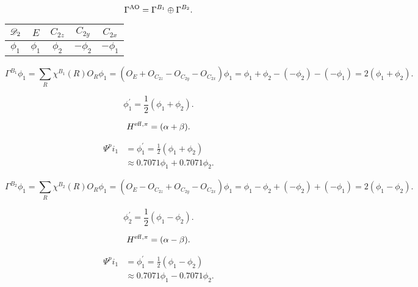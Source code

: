 \documentclass[a4paper]{book}
\newcommand{\AO}{{\rm AO}}
\newcommand{\Heff}{H^{\rm eff,\pi}}
\begin{document}
\begin{solution}
\begin{enumerate}[label=(\alph*)]
		\begin{equation*}
			\Gamma^{\AO} = \Gamma^{B_1} \oplus \Gamma^{B_2}.
		\end{equation*}
		
		\begin{center}
		\begin{tabular}{ccccc}\hline
	$\mathscr{D}_{\rm 2}$ & $E$ & $C_{2z}$ & $C_{2y}$ & $C_{2x}$ \\ \hline
			$\phi_1$	&	$\phi_1$	&	$\phi_2$	&	$-\phi_2$	&	$-\phi_1$	\\	\hline
		\end{tabular}
		\end{center}
		
		\begin{equation*}
		\Gamma^{B_1}\phi_1 = \sum_{R} \chi^{B_1}(R) O_R \phi_1 = (O_E + O_{C_{2z}} - O_{C_{2y}} - O_{C_{2x}})\phi_1 = \phi_1 +\phi_2 - (-\phi_2) - (-\phi_1) = 2(\phi_1 + \phi_2) .
		\end{equation*}
		
		\begin{equation*}
		\phi^\prime_1 = \frac{1}{2}(\phi_1 + \phi_2) .
		\end{equation*}
		
		\begin{equation*}
			\Heff = ( \alpha + \beta ).
		\end{equation*}
		
		\begin{align}
			\Psi^pi_1 &= \phi^\prime_1 = \frac{1}{2}(\phi_1 + \phi_2) \\
			&\approx 0.7071 \phi_1 + 0.7071 \phi_2.
		\end{align}
		
		
		\begin{equation*}
		\Gamma^{B_2}\phi_1 = \sum_{R} \chi^{B_2}(R) O_R \phi_1 = (O_E - O_{C_{2z}} + O_{C_{2y}} - O_{C_{2x}})\phi_1 = \phi_1 - \phi_2 + (-\phi_2) + (-\phi_1) = 2(\phi_1 - \phi_2) .
		\end{equation*}
		
		\begin{equation*}
		\phi^\prime_2 = \frac{1}{2}(\phi_1 - \phi_2) .
		\end{equation*}
		
		\begin{equation*}
			\Heff = ( \alpha - \beta ).
		\end{equation*}
		
		\begin{align}
			\Psi^pi_1 &= \phi^\prime_1 = \frac{1}{2}(\phi_1 - \phi_2) \\
			&\approx 0.7071 \phi_1 - 0.7071 \phi_2.
		\end{align}
		

\end{enumerate}
\end{solution}
\end{document}
